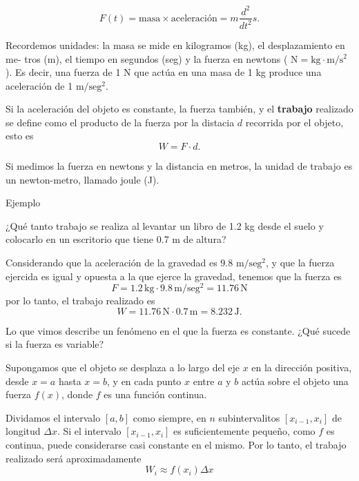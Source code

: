 \documentclass[
  letterpaper,
]{book}
\theoremstyle{plain}
\theoremstyle{remark}
\begin{document}
\[
F(t) = \text{masa} \times \text{aceleración} = m\frac{d^2}{dt^2}s.
\]

Recordemos unidades: la masa se mide en kilogramos (kg), el
desplazamiento en me- tros (m), el tiempo en segundos (seg) y la fuerza
en newtons ( \(\text{N} = \text{kg}\cdot \text{m} /\text{s}^2\) ). Es
decir, una fuerza de 1 N que actúa en una masa de 1 kg produce una
aceleración de 1 \(\text{m}/\text{seg}^2\).

Si la aceleración del objeto es constante, la fuerza también, y el
\textbf{trabajo} realizado se define como el producto de la fuerza por
la distacia \(d\) recorrida por el objeto, esto es \[
W = F \cdot d.
\]

Si medimos la fuerza en newtons y la distancia en metros, la unidad de
trabajo es un newton-metro, llamado joule (J).

Ejemplo

¿Qué tanto trabajo se realiza al levantar un libro de 1.2 kg desde el
suelo y colocarlo en un escritorio que tiene 0.7 m de altura?

\begin{tcolorbox}[enhanced jigsaw, opacityback=0, left=2mm, opacitybacktitle=0.6, toprule=.15mm, bottomrule=.15mm, colbacktitle=quarto-callout-tip-color!10!white, titlerule=0mm, bottomtitle=1mm, title=\textcolor{quarto-callout-tip-color}{\faLightbulb}\hspace{0.5em}{Solución}, toptitle=1mm, colframe=quarto-callout-tip-color-frame, colback=white, breakable, rightrule=.15mm, arc=.35mm, leftrule=.75mm, coltitle=black]

Considerando que la aceleración de la gravedad es \(9.8\)
\(\text{m}/\text{seg}^2\), y que la fuerza ejercida es igual y opuesta a
la que ejerce la gravedad, tenemos que la fuerza es \[
F = 1.2\, \text{kg} \cdot 9.8 \,\text{m}/\text{seg}^2 = 11.76\, \text{N}
\] por lo tanto, el trabajo realizado es \[
W = 11.76\, \text{N} \cdot 0.7 \, \text{m} = 8.232\, \text{J}.
\]

\end{tcolorbox}

Lo que vimos describe un fenómeno en el que la fuerza es constante. ¿Qué
sucede si la fuerza es variable?

Supongamos que el objeto se desplaza a lo largo del eje \(x\) en la
dirección positiva, desde \(x=a\) hasta \(x=b\), y en cada punto \(x\)
entre \(a\) y \(b\) actúa sobre el objeto una fuerza \(f(x)\), donde
\(f\) es una función continua.

Dividamos el intervalo \([a,b]\) como siempre, en \(n\) subintervalitos
\([x_{i-1},x_{i}]\) de longitud \(\Delta x\). Si el intervalo
\([x_{i-1},x_{i}]\) es suficientemente pequeño, como \(f\) es continua,
puede considerarse casi constante en el mismo. Por lo tanto, el trabajo
realizado será aproximadamente \[
W_i \approx f(x_i)\Delta x
\]
\end{document}
